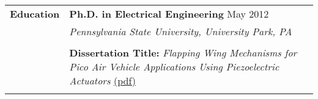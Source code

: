 \begin{tabular}{L{\hlcolw}  L{\rcolw}}
\textbf{\Large Education} & \textbf{\large Ph.D. in Electrical Engineering} \hfill {\large May 2012} \\ 
& {\it\large Pennsylvania State University, University Park, PA} \\ \\
&  \textbf{Dissertation Title:} \textit{Flapping Wing Mechanisms for Pico Air Vehicle Applications Using Piezoelectric Actuators}
\href{http://www.mne.psu.edu/mrl/theses/mateti.pdf}{(pdf)} \\
 \\ \hline  \hline
\end{tabular}